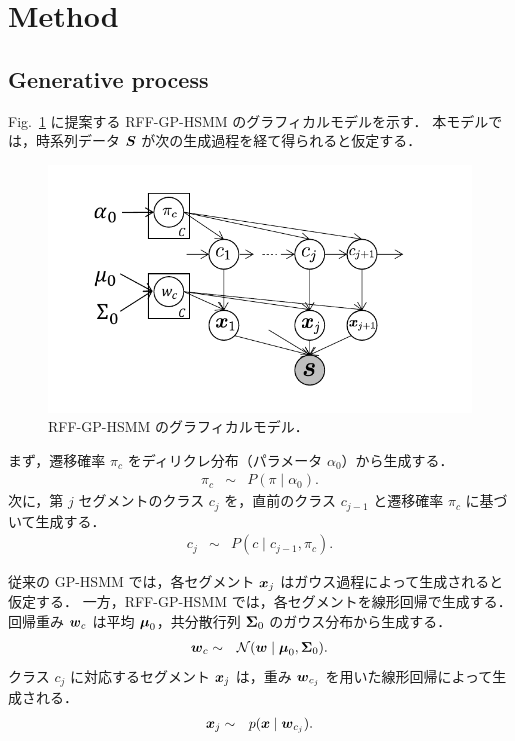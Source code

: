 \documentclass[conference]{IEEEtran}
\begin{document}
\section{Method}

\subsection{Generative process}\label{AA}
Fig.~\ref{fig:model} に提案する RFF-GP-HSMM のグラフィカルモデルを示す．  
本モデルでは，時系列データ ${ \boldsymbol S}$ が次の生成過程を経て得られると仮定する．

\begin{figure}[t]
  \begin{center}
    \includegraphics[scale=0.6]{fig/model.pdf}
    \caption{RFF-GP-HSMM のグラフィカルモデル．}
    \label{fig:model}
  \end{center}
  \vspace{-0.4cm}
\end{figure}

まず，遷移確率 $\pi_c$ をディリクレ分布（パラメータ $\alpha_0$）から生成する．
%
\begin{eqnarray}
\pi_c &\sim& P(\pi \mid \alpha_0).
\end{eqnarray}
%
次に，第 $j$ セグメントのクラス $c_j$ を，直前のクラス $c_{j-1}$ と遷移確率 $\pi_c$ に基づいて生成する．
%
\begin{eqnarray}
c_j &\sim& P(c \mid c_{j-1}, \pi_c).
\end{eqnarray}
%

従来の GP-HSMM では，各セグメント ${ \boldsymbol x}_j$ はガウス過程によって生成されると仮定する．  
一方，RFF-GP-HSMM では，各セグメントを線形回帰で生成する．  
回帰重み ${ \boldsymbol w}_c$ は平均 ${\boldsymbol\mu}_0$，共分散行列 ${\boldsymbol\Sigma}_0$ のガウス分布から生成する．
%
\begin{eqnarray}
{ \boldsymbol w}_c &\sim& \mathcal{N}({ \boldsymbol w} \mid {\boldsymbol\mu}_0, {\boldsymbol\Sigma}_0).
\end{eqnarray}
%
クラス $c_j$ に対応するセグメント ${ \boldsymbol x}_j$ は，重み ${ \boldsymbol w}_{c_j}$ を用いた線形回帰によって生成される．
%
\begin{eqnarray}
{ \boldsymbol x}_j &\sim& p({ \boldsymbol x} \mid { \boldsymbol w}_{c_j}).
\end{eqnarray}
\end{document}
